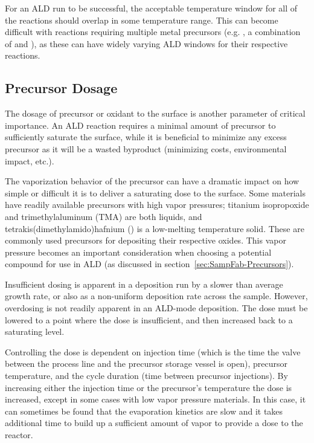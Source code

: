For an ALD run to be successful, the acceptable temperature window for all of the reactions should overlap in some temperature range. This can become difficult with reactions requiring multiple metal precursors (e.g. \PTO, a combination of  and ), as these can have widely varying ALD windows for their respective reactions. 


\subsection{Precursor Dosage}

The dosage of precursor or oxidant to the surface is another parameter of critical importance. An ALD reaction requires a minimal amount of precursor to sufficiently saturate the surface, while it is beneficial to minimize any excess precursor as it will be a wasted byproduct (minimizing costs, environmental impact, etc.). 

The vaporization behavior of the precursor can have a dramatic impact on how simple or difficult it is to deliver a saturating dose to the surface. Some materials have readily available precursors with high vapor pressures; titanium isopropoxide and trimethylaluminum (TMA) are both liquids, and tetrakis(dimethylamido)hafnium () is a low-melting temperature solid. These are commonly used precursors for depositing their respective oxides. This vapor pressure becomes an important consideration when choosing a potential compound for use in ALD (as discussed in section~\vref{sec:SampFab-Precursors}).

Insufficient dosing is apparent in a deposition run by a slower than average growth rate, or also as a non-uniform deposition rate across the sample. However, overdosing is not readily apparent in an ALD-mode deposition. The dose must be lowered to a point where the dose is insufficient, and then increased back to a saturating level. 

Controlling the dose is dependent on injection time (which is the time the valve between the process line and the precursor storage vessel is open), precursor temperature, and the cycle duration (time between precursor injections). By increasing either the injection time or the precursor's temperature the dose is increased, except in some cases with low vapor pressure materials. In this case, it can sometimes be found that the evaporation kinetics are slow and it takes additional time to build up a sufficient amount of vapor to provide a dose to the reactor. 

